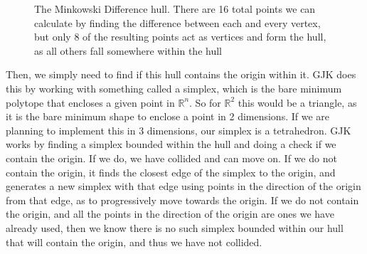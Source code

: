 \documentclass{article}
\begin{document}
\begin{figure}[H]
    \centering
    \caption{The Minkowski Difference hull. There are 16 total points we can calculate by finding the difference between each and every vertex, but only 8 of the resulting points act as vertices and form the hull, as all others fall somewhere within the hull}
    \label{fig:my_label}
\end{figure}
Then, we simply need to find if this hull contains the origin within it. GJK does this by working with something called a simplex, which is the bare minimum polytope that encloses a given point in $\mathbb{R}^n$. So for $\mathbb{R}^2$ this would be a triangle, as it is the bare minimum shape to enclose a point in 2 dimensions. If we are planning to implement this in 3 dimensions, our simplex is a tetrahedron. GJK works by finding a simplex bounded within the hull and doing a check if we contain the origin. If we do, we have collided and can move on. If we do not contain the origin, it finds the closest edge of the simplex to the origin, and generates a new simplex with that edge using points in the direction of the origin from that edge, as to progressively move towards the origin. If we do not contain the origin, and all the points in the direction of the origin are ones we have already used, then we know there is no such simplex bounded within our hull that will contain the origin, and thus we have not collided.
\\
\end{document}
